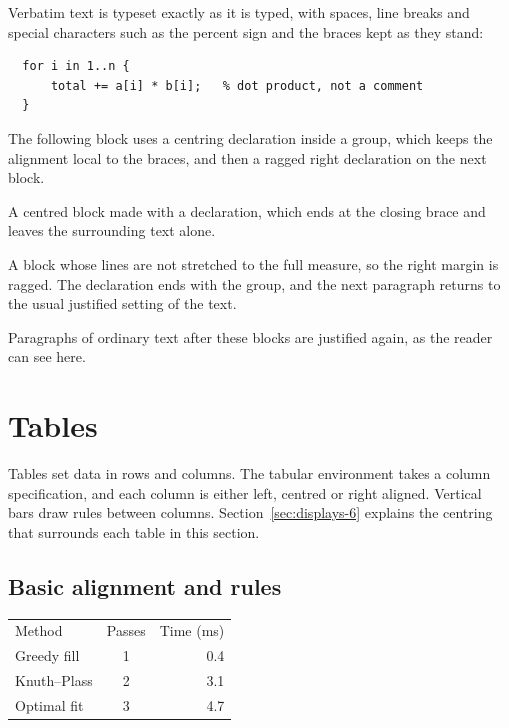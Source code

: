 \documentclass{article}
\begin{document}
Verbatim text is typeset exactly as it is typed, with spaces, line breaks and special
characters such as the percent sign and the braces kept as they stand:

\begin{verbatim}
  for i in 1..n {
      total += a[i] * b[i];   % dot product, not a comment
  }
\end{verbatim}

The following block uses a centring declaration inside a group, which keeps the
alignment local to the braces, and then a ragged right declaration on the next block.

{\centering A centred block made with a declaration, which ends at the closing
brace and leaves the surrounding text alone.\par}

{\raggedright A block whose lines are not stretched to the full measure, so the
right margin is ragged. The declaration ends with the group, and the next paragraph
returns to the usual justified setting of the text.\par}

Paragraphs of ordinary text after these blocks are justified again, as the reader can
see here.

\section{Tables}\label{sec:tables-6}

Tables set data in rows and columns. The tabular environment takes a column
specification, and each column is either left, centred or right aligned. Vertical bars
draw rules between columns. Section~\ref{sec:displays-6} explains the centring that surrounds each table in
this section.

\subsection{Basic alignment and rules}\label{sec:tables-basic-6}

\begin{center}
\begin{tabular}{l c r}
Method & Passes & Time (ms) \\
Greedy fill      & 1 & 0.4 \\
Knuth--Plass     & 2 & 3.1 \\
Optimal fit      & 3 & 4.7 \\
\end{tabular}
\end{center}
\end{document}
